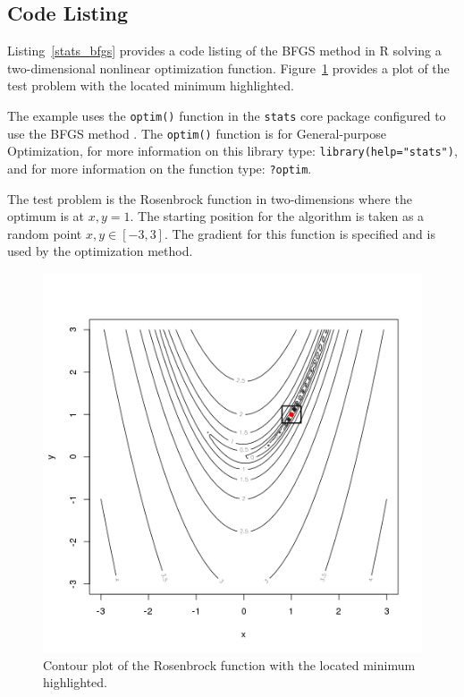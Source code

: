 \subsection{Code Listing}
Listing~\ref{stats_bfgs} provides a code listing of the BFGS method in R solving a two-dimensional nonlinear optimization function. Figure~\ref{plot:bfgs_result} provides a plot of the test problem with the located minimum highlighted.

The example uses the \texttt{optim()} function in the \texttt{stats} core package configured to use the BFGS method \cite{RDCT2011a}. The \texttt{optim()} function is for General-purpose Optimization, for more information on this library type: \texttt{library(help="stats")}, and for more information on the function type: \texttt{?optim}.

The test problem is the Rosenbrock function in two-dimensions where the optimum is at $x,y=1$. The starting position for the algorithm is taken as a random point $x,y \in [-3,3]$. The gradient for this function is specified and is used by the optimization method.




\begin{figure}[htp]
\centering
\includegraphics[scale=0.45]{book/a_optimization/bfgs_result.png}
\caption{Contour plot of the Rosenbrock function with the located minimum highlighted.}
\label{plot:bfgs_result}
\end{figure}

